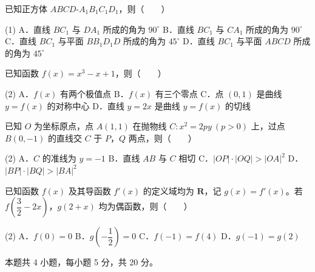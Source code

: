 \begin{question}
已知正方体 $ABCD\text{-}A_1B_1C_1D_1$，则\mbox{（　　）}

\begin{gkopts}(1)
\task A．直线 $BC_1$ 与 $DA_1$ 所成的角为 $90^\circ$
\task B．直线 $BC_1$ 与 $CA_1$ 所成的角为 $90^\circ$
\task C．直线 $BC_1$ 与平面 $BB_1D_1D$ 所成的角为 $45^\circ$
\task D．直线 $BC_1$ 与平面 $ABCD$ 所成的角为 $45^\circ$
\end{gkopts}

\end{question}
\begin{question}
已知函数 $f(x)=x^{3}-x+1$，则\mbox{（　　）}

\begin{gkopts}(2)
\task A．$f(x)$ 有两个极值点
\task B．$f(x)$ 有三个零点
\task C．点 $(0,1)$ 是曲线 $y=f(x)$ 的对称中心
\task D．直线 $y=2x$ 是曲线 $y=f(x)$ 的切线
\end{gkopts}

\end{question}
\begin{question}
已知 $O$ 为坐标原点，点 $A(1,1)$ 在抛物线 $C:x^{2}=2py\ (p>0)$ 上，过点 $B(0,-1)$ 的直线交 $C$ 于 $P$，$Q$ 两点，则\mbox{（　　）}

\begin{gkopts}(2)
\task A．$C$ 的准线为 $y=-1$
\task B．直线 $AB$ 与 $C$ 相切
\task C．$|OP|\cdot|OQ|>|OA|^{2}$
\task D．$|BP|\cdot|BQ|>|BA|^{2}$
\end{gkopts}

\end{question}
\begin{question}
已知函数 $f(x)$ 及其导函数 $f'(x)$ 的定义域均为 $\mathbf R$，记 $g(x)=f'(x)$。若 $f\left(\dfrac32-2x\right)$，$g(2+x)$ 均为偶函数，则\mbox{（　　）}

\begin{gkopts}(2)
\task A．$f(0)=0$
\task B．$g\left(-\dfrac12\right)=0$
\task C．$f(-1)=f(4)$
\task D．$g(-1)=g(2)$
\end{gkopts}

\par\medskip

\end{question}

\begin{gktip}
本题共 4 小题，每小题 5 分，共 20 分。
\end{gktip}

